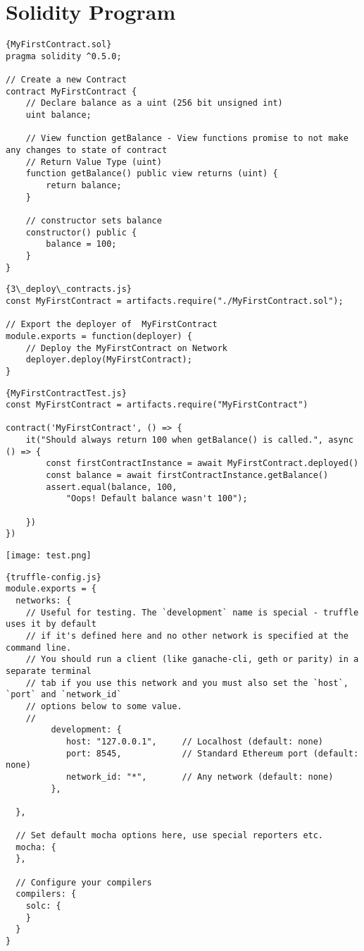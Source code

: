 \section{Solidity Program}
\begin{lstlisting}[language=solidity]{MyFirstContract.sol}
pragma solidity ^0.5.0;

// Create a new Contract
contract MyFirstContract {
	// Declare balance as a uint (256 bit unsigned int) 
	uint balance;

	// View function getBalance - View functions promise to not make any changes to state of contract 
	// Return Value Type (uint) 
	function getBalance() public view returns (uint) {
		return balance;
	}

	// constructor sets balance 
	constructor() public {
		balance = 100;
	}
}
\end{lstlisting}

\begin{lstlisting}[language=solidity]{3\_deploy\_contracts.js}
const MyFirstContract = artifacts.require("./MyFirstContract.sol");

// Export the deployer of  MyFirstContract 
module.exports = function(deployer) {
	// Deploy the MyFirstContract on Network
	deployer.deploy(MyFirstContract);
}
\end{lstlisting}

\begin{lstlisting}[language=solidity]{MyFirstContractTest.js}
const MyFirstContract = artifacts.require("MyFirstContract") 

contract('MyFirstContract', () => {
	it("Should always return 100 when getBalance() is called.", async () => {
		const firstContractInstance = await MyFirstContract.deployed()
		const balance = await firstContractInstance.getBalance()
		assert.equal(balance, 100,
			"Oops! Default balance wasn't 100");
		
	})
})
\end{lstlisting}
\texttt{[image: test.png]}
\begin{lstlisting}[language=solidity]{truffle-config.js}
module.exports = {
  networks: {
    // Useful for testing. The `development` name is special - truffle uses it by default
    // if it's defined here and no other network is specified at the command line.
    // You should run a client (like ganache-cli, geth or parity) in a separate terminal
    // tab if you use this network and you must also set the `host`, `port` and `network_id`
    // options below to some value.
    //
		 development: {
			host: "127.0.0.1",     // Localhost (default: none)
			port: 8545,            // Standard Ethereum port (default: none)
			network_id: "*",       // Any network (default: none)
		 },

  },

  // Set default mocha options here, use special reporters etc.
  mocha: {
  },

  // Configure your compilers
  compilers: {
    solc: {
    }
  }
}
\end{lstlisting}
